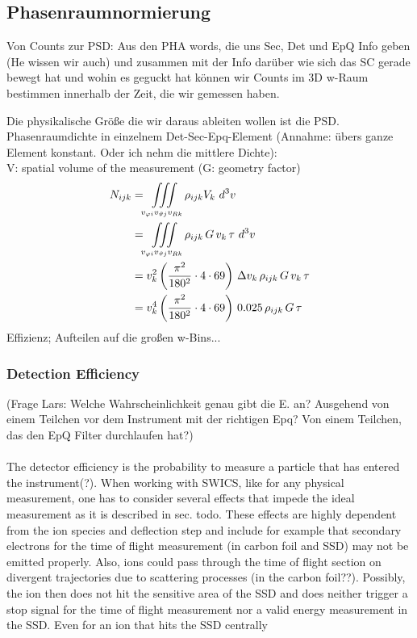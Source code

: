 %
\subsection{Phasenraumnormierung}
Von Counts zur PSD:
Aus den PHA words, die uns Sec, Det und EpQ Info geben (He wissen wir auch) und zusammen mit der Info darüber wie sich das SC gerade bewegt hat und wohin es geguckt hat können wir Counts im 3D w-Raum bestimmen innerhalb der Zeit, die wir gemessen haben.

Die physikalische Größe die wir daraus ableiten wollen ist die PSD.\\

Phasenraumdichte in einzelnem Det-Sec-Epq-Element (Annahme: übers ganze Element konstant. Oder ich nehm die mittlere Dichte):\\
V: spatial volume of the measurement (G: geometry factor)
\begin{align*}
N_{ijk} &= \iiint\displaylimits_{v_{\varphi i}v_{\vartheta j}v_{R k}} \rho_{ijk}	V_k	\,\,	d^3v \\
&= \iiint\displaylimits_{v_{\varphi i}v_{\vartheta j}v_{R k}} \rho_{ijk} \,	G \, v_k \, \tau	\,\,	d^3v \\
&= v^2_k \left(\frac{\pi^2}{180^2}\cdot4 \cdot 69\right) \, \Delta v_k \, \rho_{ijk} \,	G \, v_k \, \tau \\
&= v^4_k \left(\frac{\pi^2}{180^2}\cdot4 \cdot 69\right) \, 0.025\, \rho_{ijk} \, G  \, \tau
\end{align*}
Effizienz; Aufteilen auf die großen w-Bins...\\
\subsubsection{Detection Efficiency}
(Frage Lars: Welche Wahrscheinlichkeit genau gibt die E. an? Ausgehend von einem Teilchen vor dem Instrument mit der richtigen Epq? Von einem Teilchen, das den EpQ Filter durchlaufen hat?)\\ \\
The detector efficiency is the probability to measure a particle that has entered the instrument(?). 
When working with SWICS, like for any physical measurement, one has to consider several effects that impede the ideal measurement as it is described in sec. todo. 
These effects are highly dependent from the ion species and deflection step and include for example that secondary electrons for the time of flight measurement (in carbon foil and SSD) may not be emitted properly. Also, ions could pass through the time of flight section on divergent trajectories due to scattering processes (in the carbon foil??). Possibly, the ion then does not hit the sensitive area of the SSD and does neither trigger a stop signal for the time of flight measurement nor a valid energy measurement in the SSD. Even for an ion that hits the SSD centrally

